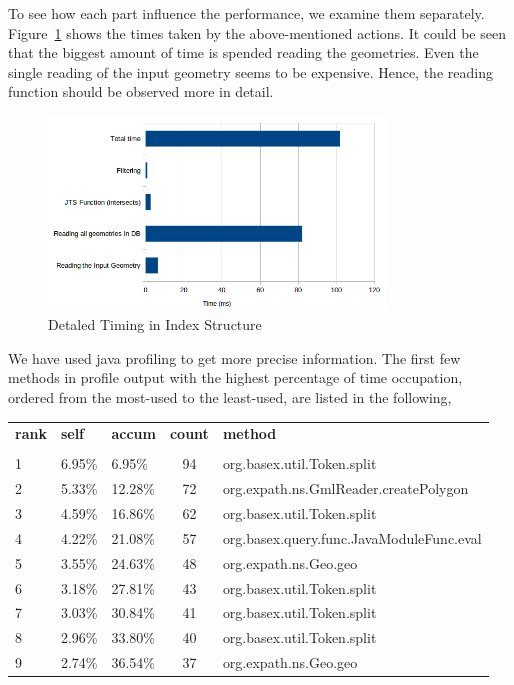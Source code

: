 \documentclass[a4paper,12pt]{article}
\begin{document}
To see how each part influence the performance, we examine them separately. Figure~\ref{figDetailedTiming} shows the times taken by the above-mentioned actions. It could be seen that the biggest amount of time is spended reading the geometries. Even the single reading of the input geometry seems to be expensive. Hence, the reading function should be observed more in detail.

\begin{figure}
\centering
\includegraphics[width=0.8\textwidth,height=0.25\textheight]{detailedTiming}
\caption{Detaled Timing in Index Structure}
\label{figDetailedTiming}
\end{figure}


We have used java profiling to get more precise information. The first few methods in profile output with the highest percentage of time occupation, ordered from the most-used to the least-used, are listed in the following,

\vspace{10px}
\begin{tabular}{l l l c l}
\textbf{rank} & \textbf{self} & \textbf{accum} & \textbf{count} & \textbf{method} \\
 & & & &\\
1 & 6.95\% & 6.95\% & 94 & org.basex.util.Token.{\color{red}split}\\
2 & 5.33\% & 12.28\% & 72 & org.expath.ns.GmlReader.createPolygon \\
3 & 4.59\% & 16.86\% & 62 & org.basex.util.Token.{\color{red}split} \\
4 & 4.22\% & 21.08\% & 57 & org.basex.query.func.JavaModuleFunc.eval \\
5 & 3.55\% & 24.63\% & 48 & org.expath.ns.Geo.geo \\
6 & 3.18\% & 27.81\% & 43 & org.basex.util.Token.{\color{red}split} \\
7 & 3.03\% & 30.84\% & 41 & org.basex.util.Token.{\color{red}split} \\
8 & 2.96\% & 33.80\% & 40 & org.basex.util.Token.{\color{red}split} \\
9 & 2.74\% & 36.54\% & 37 & org.expath.ns.Geo.geo \\
\end{tabular}
\vspace{10px}
\end{document}
